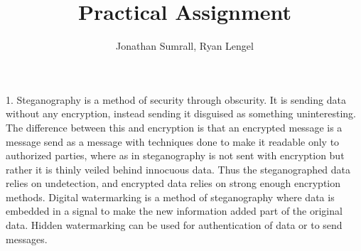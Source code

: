 \documentclass[]{apa}
\affiliation{1DV200}
\author{Jonathan Sumrall, Ryan Lengel}
\title{Practical Assignment}
\begin{document}
\doublespace
\maketitle{}

1. Steganography is a method of security through obscurity. It is sending data without any encryption, instead sending it disguised as something uninteresting. The difference between this and encryption is that an encrypted message is a message send as a message with techniques done to make it readable only to authorized parties, where as in steganography is not sent with encryption but rather it is thinly veiled behind innocuous data. Thus the steganographed data relies on undetection, and encrypted data relies on strong enough encryption methods. Digital watermarking is a method of steganography where data is embedded in a signal to make the new information added part of the original data. Hidden watermarking can be used for authentication of data or to send messages. 
\end{document}
